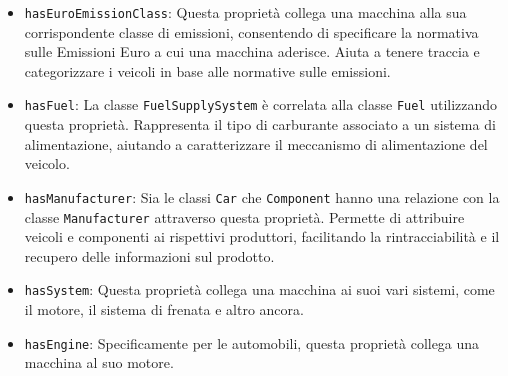\begin{itemize}
    \item \texttt{hasEuroEmissionClass}: Questa proprietà collega una macchina alla sua corrispondente classe di emissioni, consentendo di specificare la normativa sulle Emissioni Euro a cui una macchina aderisce. Aiuta a tenere traccia e categorizzare i veicoli in base alle normative sulle emissioni.
    \item \texttt{hasFuel}: La classe \texttt{FuelSupplySystem} è correlata alla classe \texttt{Fuel} utilizzando questa proprietà. Rappresenta il tipo di carburante associato a un sistema di alimentazione, aiutando a caratterizzare il meccanismo di alimentazione del veicolo.
    \item \texttt{hasManufacturer}: Sia le classi \texttt{Car} che \texttt{Component} hanno una relazione con la classe \texttt{Manufacturer} attraverso questa proprietà. Permette di attribuire veicoli e componenti ai rispettivi produttori, facilitando la rintracciabilità e il recupero delle informazioni sul prodotto.
    \item \texttt{hasSystem}: Questa proprietà collega una macchina ai suoi vari sistemi, come il motore, il sistema di frenata e altro ancora.
    \item \texttt{hasEngine}: Specificamente per le automobili, questa proprietà collega una macchina al suo motore.
\end{itemize}
